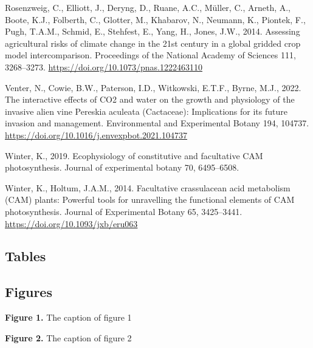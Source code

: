 \documentclass[
  12pt,
  letterpaper,
  DIV=11,
  numbers=noendperiod]{scrartcl}
\newlength{\cslhangindent}
\newlength{\cslentryspacingunit} %
\newenvironment{CSLReferences}[2] %
 {%
  \setlength{\parindent}{0pt}
  \ifodd #1
  \let\oldpar\par
  \def\par{\hangindent=\cslhangindent\oldpar}
  \fi
  \setlength{\parskip}{#2\cslentryspacingunit}
 }%
 {}
\begin{document}
\begin{CSLReferences}{1}{0}
\leavevmode{}%
Rosenzweig, C., Elliott, J., Deryng, D., Ruane, A.C., Müller, C.,
Arneth, A., Boote, K.J., Folberth, C., Glotter, M., Khabarov, N.,
Neumann, K., Piontek, F., Pugh, T.A.M., Schmid, E., Stehfest, E., Yang,
H., Jones, J.W., 2014. Assessing agricultural risks of climate change in
the 21st century in a global gridded crop model intercomparison.
Proceedings of the National Academy of Sciences 111, 3268--3273.
\url{https://doi.org/10.1073/pnas.1222463110}

\leavevmode{}%
Venter, N., Cowie, B.W., Paterson, I.D., Witkowski, E.T.F., Byrne, M.J.,
2022. The interactive effects of {CO2} and water on the growth and
physiology of the invasive alien vine {Pereskia} aculeata ({Cactaceae}):
{Implications} for its future invasion and management. Environmental and
Experimental Botany 194, 104737.
\url{https://doi.org/10.1016/j.envexpbot.2021.104737}

\leavevmode{}%
Winter, K., 2019. Ecophysiology of constitutive and facultative {CAM}
photosynthesis. Journal of experimental botany 70, 6495--6508.

\leavevmode{}%
Winter, K., Holtum, J.A.M., 2014. Facultative crassulacean acid
metabolism ({CAM}) plants: {Powerful} tools for unravelling the
functional elements of {CAM} photosynthesis. Journal of Experimental
Botany 65, 3425--3441. \url{https://doi.org/10.1093/jxb/eru063}

\end{CSLReferences}

\newpage

\hypertarget{tables}{%
\subsection{Tables}\label{tables}}

\hypertarget{figures}{%
\subsection{Figures}\label{figures}}

\textbf{Figure 1.} The caption of figure 1

\newpage

\textbf{Figure 2.} The caption of figure 2
\end{document}
